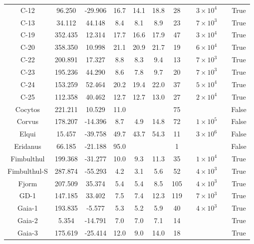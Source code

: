 \begin{table}
\begin{tabular}{cSSSSSScccc}
C-12 & 96.250 & -29.906 & 16.7 & 14.1 & 18.8 & 28 & \citet{ibata:2023} & $3 \times 10^{4}$ &  & True \\
C-13 & 34.112 & 44.148 & 8.4 & 8.1 & 8.9 & 23 & \citet{ibata:2023} & $7 \times 10^{3}$ &  & True \\
C-19 & 352.435 & 12.314 & 17.7 & 16.6 & 17.9 & 47 & \citet{ibata:2023} & $3 \times 10^{4}$ &  & True \\
C-20 & 358.350 & 10.998 & 21.1 & 20.9 & 21.7 & 19 & \citet{ibata:2023} & $6 \times 10^{4}$ &  & True \\
C-22 & 200.891 & 17.327 & 8.8 & 8.3 & 9.4 & 13 & \citet{ibata:2023} & $7 \times 10^{3}$ &  & True \\
C-23 & 195.236 & 44.290 & 8.6 & 7.8 & 9.7 & 20 & \citet{ibata:2023} & $7 \times 10^{3}$ &  & True \\
C-24 & 153.259 & 52.464 & 20.2 & 19.4 & 22.0 & 37 & \citet{ibata:2023} & $5 \times 10^{4}$ &  & True \\
C-25 & 112.358 & 40.462 & 12.7 & 12.7 & 13.0 & 27 & \citet{ibata:2023} & $2 \times 10^{4}$ &  & True \\
Cocytos & 221.211 & 10.529 & 11.0 & & & 75 & \citet{grillmair:2009} & &  & False \\
Corvus & 178.207 & -14.396 & 8.7 & 4.9 & 14.8 & 72 & \citet{mateu:2018} & $1 \times 10^{5}$ & \citet{mateu:2018} & False \\
Elqui & 15.457 & -39.758 & 49.7 & 43.7 & 54.3 & 11 & \citet{shipp:2019} & $3 \times 10^{6}$ & \citet{shipp:2018} & False \\
Eridanus & 66.185 & -21.188 & 95.0 & & & 1 & \citet{myeong:2017} & &  & False \\
Fimbulthul & 199.368 & -31.277 & 10.0 & 9.3 & 11.3 & 35 & \citet{ibata:2023} & $1 \times 10^{4}$ &  & True \\
Fimbulthul-S & 287.874 & -55.293 & 4.2 & 3.1 & 5.6 & 52 & \citet{ibata:2023} & $4 \times 10^{3}$ &  & True \\
Fjorm & 207.509 & 35.374 & 5.4 & 5.4 & 8.5 & 105 & \citet{ibata:2023} & $4 \times 10^{3}$ &  & True \\
GD-1 & 147.185 & 33.402 & 7.5 & 7.4 & 12.3 & 119 & \citet{ibata:2023} & $7 \times 10^{3}$ &  & True \\
Gaia-1 & 193.835 & -5.577 & 5.3 & 5.2 & 5.9 & 40 & \citet{ibata:2023} & $4 \times 10^{3}$ &  & True \\
Gaia-2 & 5.354 & -14.791 & 7.0 & 7.0 & 7.1 & 14 & \citet{ibata:2021} & &  & True \\
Gaia-3 & 175.619 & -25.414 & 12.0 & 9.0 & 14.0 & 18 & \citet{malhan:2018} & &  & True \\

\end{tabular}
\end{table}
